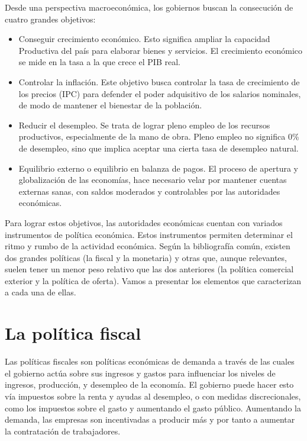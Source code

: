 \documentclass[
]{krantz}
\providecommand{\tightlist}{%
  \setlength{\itemsep}{0pt}\setlength{\parskip}{0pt}}
\begin{document}
Desde una perspectiva macroeconómica, los gobiernos buscan la consecución de cuatro grandes objetivos:

\begin{itemize}
\tightlist
\item
  Conseguir crecimiento económico. Esto significa ampliar la capacidad Productiva del país para elaborar bienes y servicios. El crecimiento económico se mide en la tasa a la que crece el PIB real.
\item
  Controlar la inflación. Este objetivo busca controlar la tasa de crecimiento de los precios (IPC) para defender el poder adquisitivo de los salarios nominales, de modo de mantener el bienestar de la población.
\item
  Reducir el desempleo. Se trata de lograr pleno empleo de los recursos productivos, especialmente de la mano de obra. Pleno empleo no significa 0\% de desempleo, sino que implica aceptar una cierta tasa de desempleo natural.
\item
  Equilibrio externo o equilibrio en balanza de pagos. El proceso de apertura y globalización de las economías, hace necesario velar por mantener cuentas externas sanas, con saldos moderados y controlables por las autoridades económicas.
\end{itemize}

Para lograr estos objetivos, las autoridades económicas cuentan con variados instrumentos de política económica. Estos instrumentos permiten determinar el ritmo y rumbo de la actividad económica. Según la bibliografía común, existen dos grandes políticas (la fiscal y la monetaria) y otras que, aunque relevantes, suelen tener un menor peso relativo que las dos anteriores (la política comercial exterior y la política de oferta). Vamos a presentar los elementos que caracterizan a cada una de ellas.

\hypertarget{la-poluxedtica-fiscal}{%
\section{La política fiscal}\label{la-poluxedtica-fiscal}}

Las políticas fiscales son políticas económicas de demanda a través de las cuales el gobierno actúa sobre sus ingresos y gastos para influenciar los niveles de ingresos, producción, y desempleo de la economía. El gobierno puede hacer esto vía impuestos sobre la renta y ayudas al desempleo, o con medidas discrecionales, como los impuestos sobre el gasto y aumentando el gasto público. Aumentando la demanda, las empresas son incentivadas a producir más y por tanto a aumentar la contratación de trabajadores.
\end{document}
